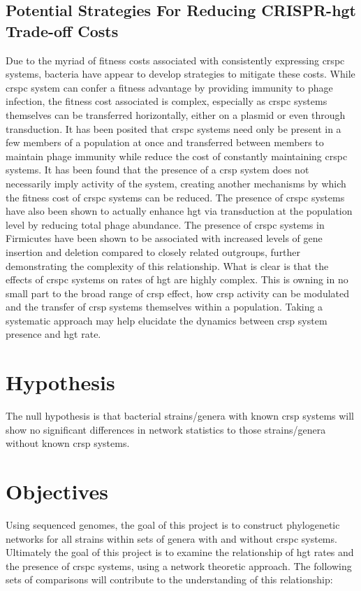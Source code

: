 \documentclass[12pt,letter]{article}
\begin{document}
\subsection{Potential Strategies For Reducing CRISPR-\ac{hgt} Trade-off Costs}
Due to the  myriad of fitness costs associated with consistently expressing \ac{crspc} systems, bacteria have appear to develop strategies to mitigate these costs.
While \ac{crspc} system can confer a fitness advantage by providing immunity to phage infection, the fitness cost associated is complex, especially as \ac{crspc} systems  themselves can be transferred  horizontally, either on a plasmid or even through transduction\citep{crisprlgt}.
It has been posited that \ac{crspc} systems need only be present in a few members of a population at once and transferred between members to maintain phage immunity while reduce the cost of constantly maintaining \ac{crspc} systems\citep{acqorres}.
It has been found that the presence of a \ac{crsp} system does not necessarily imply activity of the system, creating another mechanisms by which the fitness cost of \ac{crspc} systems can be reduced\citep{acqorres}.
The presence of \ac{crspc} systems have also been shown to actually enhance \ac{hgt} via transduction at the population level by reducing total phage abundance\citep{transhgt}.
The presence of \ac{crspc} systems in Firmicutes have been shown to be associated with increased levels of gene insertion and deletion compared to closely related outgroups, further demonstrating the complexity of this relationship\citep{athena}.
What is clear is that the effects of \ac{crspc} systems on rates of \ac{hgt} are highly complex.
This is owning in no small part to the broad range of \ac{crsp} effect, how \ac{crsp} activity can be modulated and the transfer of \ac{crsp} systems themselves within a population\citep{acqorres}.
Taking a systematic approach may help elucidate the dynamics between \ac{crsp} system presence and \ac{hgt} rate.
\section{\huge Hypothesis}
The null hypothesis is that bacterial strains/genera with known \ac{crsp} systems will show no significant differences in network statistics to those strains/genera without known \ac{crsp} systems.
\section{\huge Objectives}
Using sequenced genomes, the goal of this project is to construct phylogenetic networks for all strains within sets of genera with and without \ac{crspc} systems.
Ultimately the goal of this project is to examine the relationship of \ac{hgt} rates and the presence of \ac{crspc} systems, using a network theoretic approach. The following sets of comparisons will contribute to the understanding of this relationship:
\end{document}

